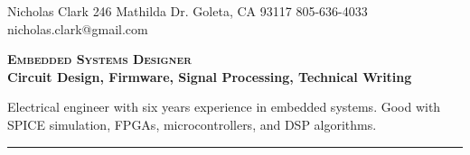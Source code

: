 \documentclass[letterpaper, 10pt]{article}
\begin{document}
\nrctitle
{Nicholas Clark}
{246 Mathilda Dr.}
{Goleta, CA 93117}
{805-636-4033}
{nicholas.clark@gmail.com}
%
\begin{center}
\Large \textbf{\textsc{Embedded Systems Designer}}\\
\large \textbf{{Circuit Design, Firmware, Signal Processing, Technical Writing}}\par
\smallskip
Electrical engineer with six years experience in embedded systems. 
Good with SPICE simulation, FPGAs, microcontrollers, and DSP algorithms. 
\end{center}
\smallskip \bigskip
\hrule
\par \bigskip


\begin{spacing}{0.5} \noindent \begin{minipage}[t]{0.4\textwidth}


\end{minipage}
\end{spacing}
\end{document}
